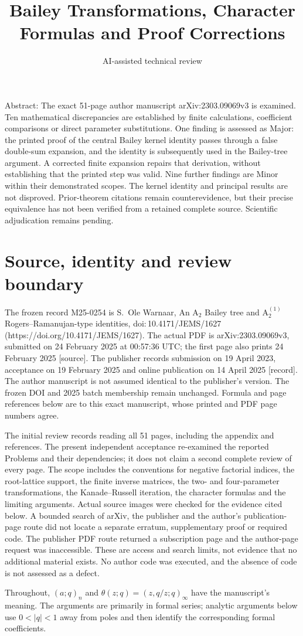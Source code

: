 \documentclass[10pt]{article}
\title{Bailey Transformations, Character Formulas
and Proof Corrections}
\author{AI-assisted technical review}
\date{}
\begin{document}
\maketitle
Abstract: The exact 51-page author manuscript arXiv:2303.09069v3 is examined. Ten mathematical discrepancies are established by finite calculations, coefficient comparisons or direct parameter substitutions. One finding is assessed as Major: the printed proof of the central Bailey kernel identity passes through a false double-sum expansion, and the identity is subsequently used in the Bailey-tree argument. A corrected finite expansion repairs that derivation, without establishing that the printed step was valid. Nine further findings are Minor within their demonstrated scopes. The kernel identity and principal results are not disproved. Prior-theorem citations remain counterevidence, but their precise equivalence has not been verified from a retained complete source. Scientific adjudication remains pending.\par
\section*{Source, identity and review boundary}
The frozen record M25-0254 is S. Ole Warnaar, An \(\mathrm A_2\) Bailey tree and \(\mathrm A_2^{(1)}\) Rogers–Ramanujan-type identities, doi: 10.4171/JEMS/1627 (https://doi.org/10.4171/JEMS/1627). The actual PDF is arXiv:2303.09069v3, submitted on 24 February 2025 at 00:57:36 UTC; the first page also prints 24 February 2025 [source]. The publisher records submission on 19 April 2023, acceptance on 19 February 2025 and online publication on 14 April 2025 [record]. The author manuscript is not assumed identical to the publisher’s version. The frozen DOI and 2025 batch membership remain unchanged. Formula and page references below are to this exact manuscript, whose printed and PDF page numbers agree.\par
The initial review records reading all 51 pages, including the appendix and references. The present independent acceptance re-examined the reported Problems and their dependencies; it does not claim a second complete review of every page. The scope includes the conventions for negative factorial indices, the root-lattice support, the finite inverse matrices, the two- and four-parameter transformations, the Kanade–Russell iteration, the character formulas and the limiting arguments. Actual source images were checked for the evidence cited below. A bounded search of arXiv, the publisher and the author’s publication-page route did not locate a separate erratum, supplementary proof or required code. The publisher PDF route returned a subscription page and the author-page request was inaccessible. These are access and search limits, not evidence that no additional material exists. No author code was executed, and the absence of code is not assessed as a defect.\par
Throughout, \((a;q)_n\) and \(\theta(z;q)=(z,q/z;q)_\infty\) have the manuscript’s meaning. The arguments are primarily in formal series; analytic arguments below use \(0<|q|<1\) away from poles and then identify the corresponding formal coefficients.\par
\end{document}
